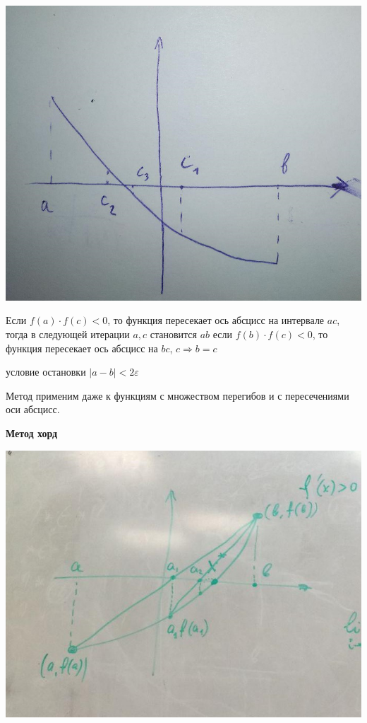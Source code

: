 \documentclass[11pt]{article}
\begin{document}
\begin{center}
\includegraphics[scale=0.5]{рис2.jpg} 
\end{center}
 
Если $f(a) \cdot f(c) < 0$, то функция пересекает ось абсцисс на интервале $ac$, тогда в следующей итерации $a,c$ становится $ab$
 если $f(b) \cdot f(c) < 0$, то функция пересекает ось абсцисс на $bc$, $c \Rightarrow b = c$
 
 условие остановки $|a -b| < 2\varepsilon$ 

Метод применим даже к функциям с множеством перегибов и  с пересечениями оси абсцисс.
 
{\large \textbf{Метод хорд}}

\begin{center}
\includegraphics[scale=0.8]{рис3.jpg} 
\end{center}
\end{document}
